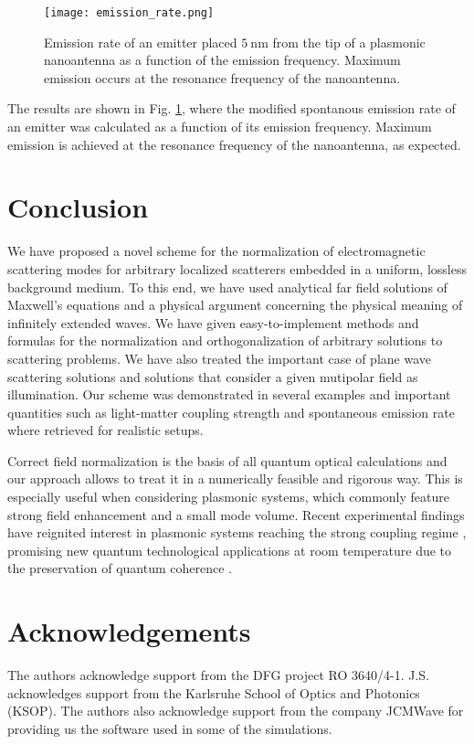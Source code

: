 \documentclass[10pt,letterpaper]{article}
\begin{document}
\begin{figure}
\begin{center}
\texttt{[image: emission\_rate.png]}
\end{center}
\caption{Emission rate of an emitter placed $5~\text{nm}$ from the tip of a plasmonic nanoantenna as a function of the emission frequency. Maximum emission occurs at the resonance frequency of the nanoantenna.}
\label{fig:emission_rate}
\end{figure}

The results are shown in Fig. \ref{fig:emission_rate}, where the modified spontanous emission rate of an emitter was calculated as a function of its emission frequency. Maximum emission is achieved at the resonance frequency of the nanoantenna, as expected.

\section{Conclusion}
\label{sec:conclusion}

We have proposed a novel scheme for the normalization of electromagnetic scattering modes for arbitrary localized scatterers embedded in a uniform, lossless background medium. To this end, we have used analytical far field solutions of Maxwell's equations and a physical argument concerning the physical meaning of infinitely extended waves. We have given easy-to-implement methods and formulas for the normalization and orthogonalization of arbitrary solutions to scattering problems. We have also treated the important case of plane wave scattering solutions and solutions that consider a given mutipolar field as illumination. Our scheme was demonstrated in several examples and important quantities such as light-matter coupling strength and spontaneous emission rate where retrieved for realistic setups.

Correct field normalization is the basis of all quantum optical calculations and our approach allows to treat it in a numerically feasible and rigorous way. This is especially useful when considering plasmonic systems, which commonly feature strong field enhancement and a small mode volume. Recent experimental findings \cite{Marinica2015, Chikkaraddy2016} have reignited interest in plasmonic systems reaching the strong coupling regime \cite{Hummer2013}, promising new quantum technological applications at room temperature \cite{Jacob2012, Tame2013} due to the preservation of quantum coherence \cite{Torma2015}.

\section{Acknowledgements}
The authors acknowledge support from the DFG project RO 3640/4-1. J.S. acknowledges support from the Karlsruhe School of Optics and Photonics (KSOP). The authors also acknowledge support from the company JCMWave for providing us the software used in some of the simulations.
\end{document}
